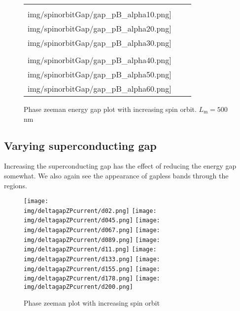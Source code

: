 \documentclass[10pt,a4paper]{article}
\newcommand{\img}{./images}
\begin{document}
		\begin{figure}[H]
			\begin{tabular}{ccc}
				\texttt{[image: \\img/spinorbitGap/gap\_pB\_alpha10.png]}&
				\texttt{[image: \\img/spinorbitGap/gap\_pB\_alpha20.png]}&
				\texttt{[image: \\img/spinorbitGap/gap\_pB\_alpha30.png]}\\
				\texttt{[image: \\img/spinorbitGap/gap\_pB\_alpha40.png]}&
				\texttt{[image: \\img/spinorbitGap/gap\_pB\_alpha50.png]}&
				\texttt{[image: \\img/spinorbitGap/gap\_pB\_alpha60.png]}\\
			\end{tabular}
			\caption{Phase zeeman energy gap plot with increasing spin orbit. $L_\text{m}=500$nm}
			\label{fig:gap_pB_soi}
		\end{figure}
\newpage	
	\subsection{Varying superconducting gap}
	Increasing the superconducting gap has the effect of reducing the energy gap somewhat. We also again see the appearance of gapless bands through the regions.
		\begin{figure}[H]
			\texttt{[image: \\img/deltagapZPcurrent/d02.png]}
			\texttt{[image: \\img/deltagapZPcurrent/d045.png]}
			\texttt{[image: \\img/deltagapZPcurrent/d067.png]}
			\texttt{[image: \\img/deltagapZPcurrent/d089.png]}
			\texttt{[image: \\img/deltagapZPcurrent/d11.png]}
			\texttt{[image: \\img/deltagapZPcurrent/d133.png]}
			\texttt{[image: \\img/deltagapZPcurrent/d155.png]}
			\texttt{[image: \\img/deltagapZPcurrent/d178.png]}
			\texttt{[image: \\img/deltagapZPcurrent/d200.png]}
			\caption{Phase zeeman plot with increasing spin orbit}
		\end{figure}
\newpage
\end{document}
